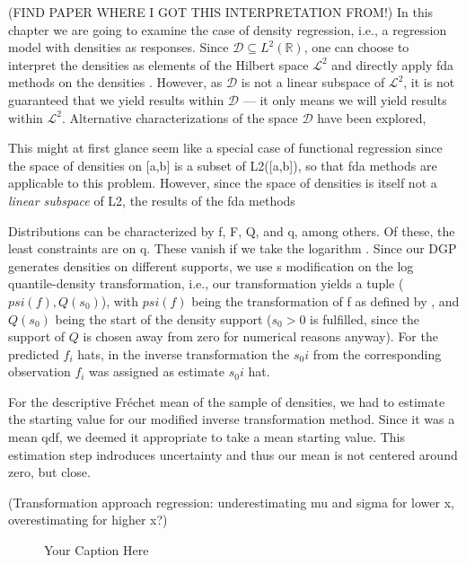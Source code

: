 (FIND PAPER WHERE I GOT THIS INTERPRETATION FROM!)
In this chapter we are going to examine the case of density regression, i.e., a
regression model with densities as responses. Since $\mathcal{D} \subseteq L^2(\mathbb{R})$,
one can choose to interpret the densities as elements of
the Hilbert space $\mathcal{L}^2$ and directly apply fda methods on the densities
\parencite[see e.g.][]{KneipUtikal2001}. However,
as $\mathcal{D}$ is not a linear subspace of $\mathcal{L}^2$, it is not guaranteed that
we yield results within $\mathcal{D}$ --- it only means we will yield results within $\mathcal{L}^2$.
Alternative characterizations of the space $\mathcal{D}$ have been explored,

This might at first glance seem like a
special case of functional regression since the space of densities on [a,b] is a subset
of L2([a,b]), so that fda methods are applicable to this problem. However, since the
space of densities is itself not a \textit{linear subspace} of L2, the results of the
fda methods

Distributions can be characterized by f, F, Q, and q, among others. Of these, the least
constraints are on q. These vanish if we
take the logarithm \parencite[cf.][]{KokoszkaEtAl2019}. Since our DGP generates densities on
different supports, we use \textcite{KokoszkaEtAl2019}s modification on the log quantile-density
transformation, i.e., our transformation yields a tuple ($psi(f), Q(s_0)$), with
$psi(f)$ being the transformation of f as defined by \textcite{PetersenMüller2016}, and
$Q(s_0)$ being the start of the density support ($s_0 > 0$ is fulfilled, since the support
of $Q$ is chosen away from zero for numerical reasons anyway). For the predicted $f_i$ hats,
in the inverse transformation the $s_0i$ from the corresponding observation $f_i$ was
assigned as estimate $s_0i$ hat.

For the descriptive Fréchet mean of the sample of densities, we had to estimate the
starting value for our modified inverse transformation method. Since it was a mean qdf,
we deemed it appropriate to take a mean starting value. This estimation step indroduces
uncertainty and thus our mean is not centered around zero, but close.

(Transformation approach regression: underestimating mu and sigma for lower x,
overestimating for higher x?) \textcite{PetersenLiuDivani2021}

\begin{figure}[h]
    \centering
    
    \caption{Your Caption Here}
    \label{fig:your_label}
\end{figure}


